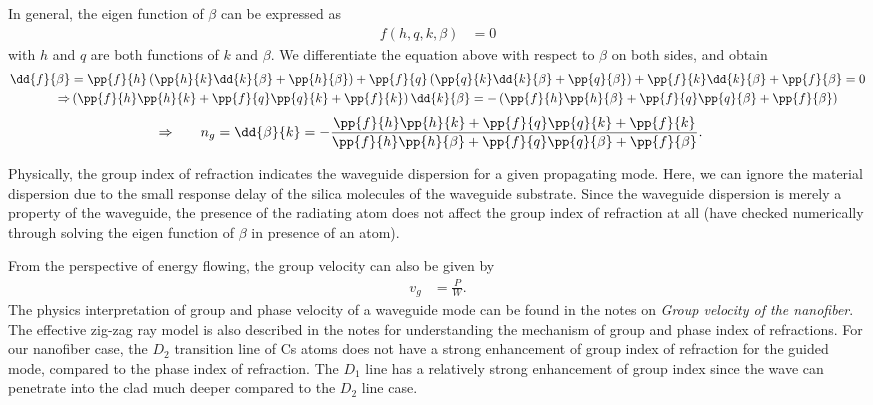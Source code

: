 \documentclass[]{report}
\begin{document}
In general, the eigen function of $ \beta $ can be expressed as
\begin{align}
f(h,q,k,\beta) &=0
\end{align}
with $ h $ and $ q $ are both functions of $ k $ and $ \beta $. 
We differentiate the equation above with respect to $ \beta $ on both sides, and obtain
\begin{align}
\dd{f}{\beta} &= \pp{f}{h} \left(\pp{h}{k}\dd{k}{\beta}+\pp{h}{\beta} \right) + \pp{f}{q}\left(\pp{q}{k}\dd{k}{\beta}+\pp{q}{\beta} \right) +\pp{f}{k}\dd{k}{\beta}+\pp{f}{\beta}=0\\
\Rightarrow & \left( \pp{f}{h}\pp{h}{k}+\pp{f}{q}\pp{q}{k}+\pp{f}{k} \right)\dd{k}{\beta} = -\left(\pp{f}{h}\pp{h}{\beta}+\pp{f}{q}\pp{q}{\beta}+\pp{f}{\beta} \right)
\end{align}
\begin{align}
\Rightarrow &\quad\quad n_g = \dd{\beta}{k} = -\frac{\pp{f}{h}\pp{h}{k}+\pp{f}{q}\pp{q}{k}+\pp{f}{k}}
{\pp{f}{h}\pp{h}{\beta}+\pp{f}{q}\pp{q}{\beta}+\pp{f}{\beta}}.
\end{align}

Physically, the group index of refraction indicates the waveguide dispersion for a given propagating mode. Here, we can ignore the material dispersion due to the small response delay of the silica molecules of the waveguide substrate. Since the waveguide dispersion is merely a property of the waveguide, the presence of the radiating atom does not affect the group index of refraction at all (have checked numerically through solving the eigen function of $ \beta $ in presence of an atom). 

From the perspective of energy flowing, the group velocity can also be given by
\begin{align}
v_g&=\frac{P}{W}.
\end{align}
The physics interpretation of group and phase velocity of a waveguide mode can be found in the notes on \textit{Group velocity of the nanofiber}. The effective zig-zag ray model is also described in the notes for understanding the mechanism of group and phase index of refractions. For our nanofiber case, the $ D_2 $ transition line of Cs atoms does not have a strong enhancement of group index of refraction for the guided mode, compared to the phase index of refraction. The $ D_1 $ line has a relatively strong enhancement of group index since the wave can penetrate into the clad much deeper compared to the $ D_2 $ line case. 
\end{document}
